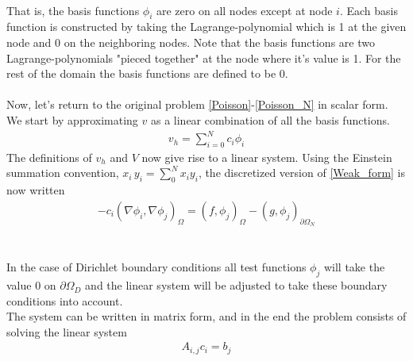 \\
That is, the basis functions $\phi_i$ are zero on all nodes except at node $i$. Each basis function is constructed by taking the Lagrange-polynomial which is 1 at the given node and 0 on the neighboring nodes. Note that the basis functions are two Lagrange-polynomials "pieced together" at the node where it's value is 1. For the rest of the domain the basis functions are defined to be 0. \\ \\

Now, let's return to the original problem \eqref{Poisson}-\eqref{Poisson_N} in scalar form. We start by approximating $v$ as a linear combination of all the basis functions. 
\begin{align}
v_h = \sum_{i=0}^N c_i \phi_i \label{u_hsum}
\end{align}
The definitions of $v_h$ and $V$ now give rise to a linear system. Using the Einstein summation convention, $x_i\,y_i = \sum_0^N x_i y_i $, the discretized version of \eqref{Weak_form} is now written 
\begin{align}
-c_i(\nabla \phi_i, \nabla \phi_j)_\Omega = (f,\phi_j)_\Omega - (g, \phi_j)_{\partial \Omega_N} \label{|linear_system}
\end{align}
\\
\\

In the case of Dirichlet boundary conditions all test functions $\phi_j$ will take the value 0 on $\partial \Omega_D$ and the linear system will be adjusted to take these boundary conditions into account. \\
The system can be written in matrix form, and in the end the problem consists of solving the linear system
\begin{align} A_{i,j}c_i = b_j \label{Matrix_1} \end{align}
\\
\\
